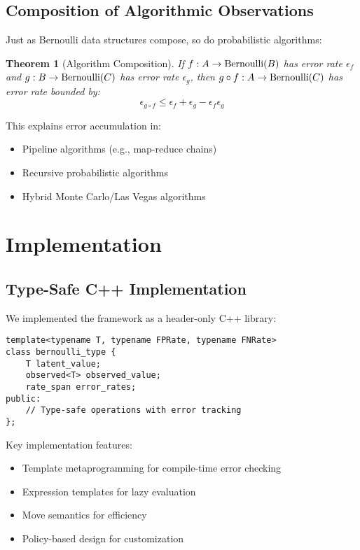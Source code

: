 \documentclass[11pt]{article}
\newtheorem{theorem}{Theorem}
\begin{document}
\subsection{Composition of Algorithmic Observations}

Just as Bernoulli data structures compose, so do probabilistic algorithms:

\begin{theorem}[Algorithm Composition]
If $f: A \to \text{Bernoulli}(B)$ has error rate $\epsilon_f$ and $g: B \to \text{Bernoulli}(C)$ has error rate $\epsilon_g$, then $g \circ f: A \to \text{Bernoulli}(C)$ has error rate bounded by:
$$\epsilon_{g \circ f} \leq \epsilon_f + \epsilon_g - \epsilon_f \epsilon_g$$
\end{theorem}

This explains error accumulation in:
\begin{itemize}
\item Pipeline algorithms (e.g., map-reduce chains)
\item Recursive probabilistic algorithms
\item Hybrid Monte Carlo/Las Vegas algorithms
\end{itemize}

\section{Implementation}

\subsection{Type-Safe C++ Implementation}

We implemented the framework as a header-only C++ library:

\begin{verbatim}
template<typename T, typename FPRate, typename FNRate>
class bernoulli_type {
    T latent_value;
    observed<T> observed_value;
    rate_span error_rates;
public:
    // Type-safe operations with error tracking
};
\end{verbatim}

Key implementation features:
\begin{itemize}
\item Template metaprogramming for compile-time error checking
\item Expression templates for lazy evaluation
\item Move semantics for efficiency
\item Policy-based design for customization
\end{itemize}
\end{document}
